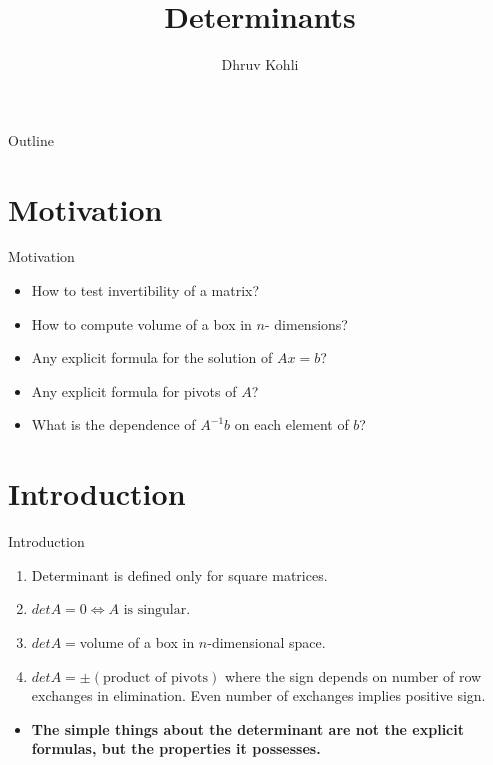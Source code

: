 \documentclass{beamer}
\title{Determinants}
\author{Dhruv Kohli}
\institute[Indian Institute of Technology, Guwahati] %
{
  Department of Mathematics\\
  Indian Institute of Technology, Guwahati
}
\date{}
\begin{document}
\setlength{\abovedisplayskip}{1pt}
\setlength{\belowdisplayskip}{1pt}

\begin{frame}
  \titlepage
\end{frame}

\begin{frame}{Outline}
  \tableofcontents
\end{frame}

\section{Motivation}
\begin{frame}{Motivation}{}
  \begin{itemize}
  \item How to test invertibility of a matrix?
  \item How to compute volume of a box in $n$- dimensions?
  \item Any explicit formula for the solution of $Ax=b$?
  \item Any explicit formula for pivots of $A$?
  \item What is the dependence of $A^{-1}b$ on each element of $b$?
  \end{itemize}
\end{frame}

\section{Introduction}
\begin{frame}{Introduction}
\begin{enumerate}
    \item Determinant is defined only for square matrices.
    \item $detA = 0 \iff A \text{ is singular}$.
    \item $detA = $volume of a box in $n$-dimensional space.
    \item $detA = \pm (\text{product of pivots})$ where the sign depends on number of row exchanges in elimination. Even number of exchanges implies positive sign.
\end{enumerate}
\begin{itemize}
    \item \textbf{The simple things about the determinant are not the explicit formulas, but the properties it possesses.}
\end{itemize}
\end{frame}
\end{document}
